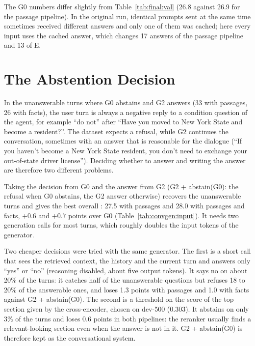 The G0 numbers differ slightly from Table~\ref{tab:final:val} (26.8 against 26.9 for the
passage pipeline). In the original run, identical prompts sent at the same time sometimes
received different answers and only one of them was cached; here every input uses the
cached answer, which changes 17 answers of the passage pipeline and 13 of E.


\section{The Abstention Decision}\label{sec:convgen:abstain}

In the unanswerable turns where G0 abstains and G2 answers (33 with passages, 26 with
facts), the user turn is always a negative reply to a condition question of the agent,
for example ``do not'' after ``Have you moved to New York State and become a resident?''.
The dataset expects a refusal, while G2 continues the conversation, sometimes with an
answer that is reasonable for the dialogue (``If you haven't become a New York State
resident, you don't need to exchange your out-of-state driver license''). Deciding
whether to answer and writing the answer are therefore two different problems.

Taking the decision from G0 and the answer from G2 (G2 + abstain(G0): the refusal when G0
abstains, the G2 answer otherwise) recovers the unanswerable turns and gives the best
overall \fone{}: 27.5 with passages and 28.0 with passages and facts, $+0.6$ and $+0.7$
points over G0 (Table~\ref{tab:convgen:input}). It needs two generation calls for most
turns, which roughly doubles the input tokens of the generator.

Two cheaper decisions were tried with the same generator. The first is a short call that
sees the retrieved context, the history and the current turn and answers only ``yes'' or
``no'' (reasoning disabled, about five output tokens). It says no on about 20\% of the
turns: it catches half of the unanswerable questions but refuses 18 to 20\% of the
answerable ones, and loses 1.3 points with passages and 1.0 with facts against
G2 + abstain(G0). The second is a threshold on the score of the top section given by the
cross-encoder, chosen on dev-500 (0.303). It abstains on only 3\% of the turns and loses
0.6 points in both pipelines: the reranker usually finds a relevant-looking section even
when the answer is not in it. G2 + abstain(G0) is therefore kept as the conversational
system.


